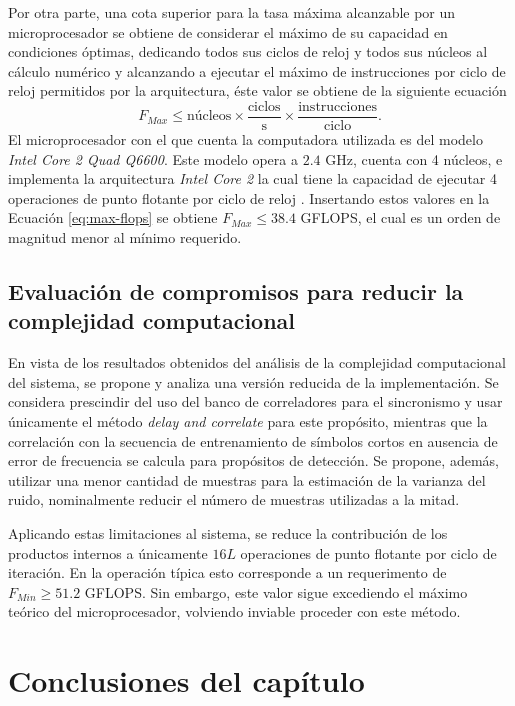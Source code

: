 Por otra parte, una cota superior para la tasa máxima alcanzable por un microprocesador se obtiene de considerar el máximo de su capacidad en condiciones óptimas, dedicando todos sus ciclos de reloj y todos sus núcleos al cálculo numérico y alcanzando a ejecutar el máximo de instrucciones por ciclo de reloj permitidos por la arquitectura, éste valor se obtiene de la siguiente ecuación
\begin{equation}\label{eq:max-flops}
    F_{Max} \le \text{núcleos} \times \frac{\text{ciclos}}{\text{s}}\times\frac{\text{instrucciones}}{\text{ciclo}}.
\end{equation}
El microprocesador con el que cuenta la computadora utilizada es del modelo \textit{Intel Core 2 Quad Q6600}. Este modelo opera a $2.4$ GHz, cuenta con 4 núcleos, e implementa la arquitectura \textit{Intel Core 2} la cual tiene la capacidad de ejecutar 4 operaciones de punto flotante por ciclo de reloj \cite{fog}. Insertando estos valores en la Ecuación \ref{eq:max-flops} se obtiene $F_{Max}\le 38.4$ GFLOPS, el cual es un orden de magnitud menor al mínimo requerido.

\subsection{Evaluación de compromisos para reducir la complejidad computacional}

En vista de los resultados obtenidos del análisis de la complejidad computacional del sistema, se propone y analiza una versión reducida de la implementación. Se considera prescindir del uso del banco de correladores para el sincronismo y usar únicamente el método \textit{delay and correlate} para este propósito, mientras que la correlación con la secuencia de entrenamiento de símbolos cortos en ausencia de error de frecuencia se calcula para propósitos de detección. Se propone, además, utilizar una menor cantidad de muestras para la estimación de la varianza del ruido, nominalmente reducir el número de muestras utilizadas a la mitad. 

Aplicando estas limitaciones al sistema, se reduce la contribución de los productos internos a únicamente $16L$ operaciones de punto flotante por ciclo de iteración. En la operación típica esto corresponde a un requerimento de $F_{Min} \ge 51.2$ GFLOPS. Sin embargo, este valor sigue excediendo el máximo teórico del microprocesador, volviendo inviable proceder con este método.


\color{black}

\section{Conclusiones del capítulo}

